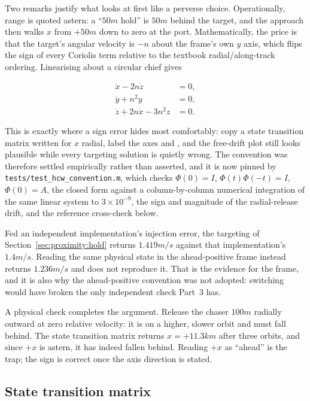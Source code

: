 Two remarks justify what looks at first like a perverse choice. Operationally,
\vbar{} range is quoted astern: a ``$50\unit{m}$ \vbar{} hold'' is $50\unit{m}$
behind the target, and the approach then walks $x$ from $+50\unit{m}$ down to
zero at the port. Mathematically, the price is that the target's angular
velocity is $-n$ about the frame's own $y$ axis, which flips the sign of every
Coriolis term relative to the textbook radial/along-track ordering. Linearising
about a circular chief \cite{cw1960} gives

\begin{align}
\ddot x - 2n\dot z &= 0, \label{eq:hcw1}\\
\ddot y + n^2 y &= 0, \label{eq:hcw2}\\
\ddot z + 2n\dot x - 3n^2 z &= 0. \label{eq:hcw3}
\end{align}

This is exactly where a sign error hides most comfortably: copy a state
transition matrix written for $x$ radial, label the axes \vbar{} and \rbar{}, and
the free-drift plot still looks plausible while every targeting solution is
quietly wrong. The convention was therefore settled empirically rather than
asserted, and it is now pinned by \texttt{tests/test\_hcw\_convention.m}, which
checks $\Phi(0) = I$, $\Phi(t)\Phi(-t) = I$, $\dot\Phi(0) = A$, the closed form
against a column-by-column numerical integration of the same linear system to
$3\times10^{-9}$, the sign and magnitude of the radial-release drift, and the
reference cross-check below.

Fed an independent implementation's injection error, the targeting of
Section~\ref{sec:proximity:hold} returns $1.419\unit{m/s}$ against that
implementation's $1.4\unit{m/s}$. Reading the same physical state in the
ahead-positive frame instead returns $1.236\unit{m/s}$ and does not reproduce
it. That is the evidence for the frame, and it is also why the ahead-positive
convention was not adopted: switching would have broken the only independent
check Part~3 has.

A physical check completes the argument. Release the chaser $100\unit{m}$
radially outward at zero relative velocity: it is on a higher, slower orbit and
must fall behind. The state transition matrix returns $x = +11.3\unit{km}$ after
three orbits, and since $+x$ is astern, it has indeed fallen behind. Reading
$+x$ as ``ahead'' is the trap; the sign is correct once the axis direction is
stated.

\subsection{State transition matrix}

